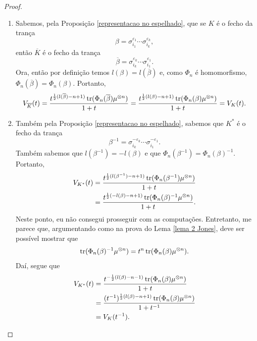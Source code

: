 	\begin{proof}
	    \begin{enumerate}
	        \item Sabemos, pela Proposição \ref{representacao no espelhado}, que se $K$ é o fecho da trança 
	        \[
	        \beta = \sigma_{i_1}^{\varepsilon_1}\cdots\sigma_{i_k}^{\varepsilon_k},
	        \]
	        então $\overline{K}$ é o fecho da trança
	        \[
	        \overline{\beta} = \sigma_{i_k}^{\varepsilon_k}\cdots\sigma_{i_1}^{\varepsilon_1}.
	        \]
	        Ora, então por definição temos $l(\beta) = l(\overline{\beta})$ e, como $\Phi_n$
	        é homomorfismo, $\Phi_n(\overline{\beta}) = \Phi_n(\beta)$. Portanto,
	        \[
	        V_{\overline{K}}(t) 
	        = \frac{t^{\frac{1}{2}(l(\overline{\beta}) - n + 1)}\operatorname{tr}(\Phi_n(\overline{\beta})\mu^{\otimes n})}{1+t}
	        = \frac{t^{\frac{1}{2}(l(\beta) - n + 1)}\operatorname{tr}(\Phi_n(\beta)\mu^{\otimes n})}{1+t}
	        = V_{K}(t).
	        \]
	        \item Também pela Proposição \ref{representacao no espelhado}, sabemos que $K^*$
	        é o fecho da trança
	        \[
	        \beta^{-1} = \sigma_{i_k}^{-\varepsilon_k}\cdots\sigma_{i_1}^{-\varepsilon_1}.
	        \]
	        Também sabemos que $l(\beta^{-1}) = -l(\beta)$ e que $\Phi_n(\beta^{-1}) = \Phi_n(\beta)^{-1}$.
	        Portanto,
	        \begin{align*}
	            V_{K^*}(t) &= \frac{t^{\frac{1}{2}(l(\beta^{-1})- n + 1)}\operatorname{tr}(\Phi_n(\beta^{-1})\mu^{\otimes n})}{1+t} \\
	                       &= \frac{t^{\frac{1}{2}(-l(\beta) - n + 1)}\operatorname{tr}(\Phi_n(\beta)^{-1}\mu^{\otimes n})}{1+t}.
	        \end{align*}
	        Neste ponto, eu não consegui prosseguir com as computações. Entretanto, me parece que,
	        argumentando como na prova do Lema \ref{lema 2 Jones}, deve ser possível mostrar que
	        \[
	        \operatorname{tr}(\Phi_n(\beta)^{-1}\mu^{\otimes n}) = t^n\operatorname{tr}(\Phi_n(\beta)\mu^{\otimes n}).
	        \]
	        Daí, segue que
	        \begin{align*}
	            V_{K^*}(t) 
	            &= \frac{t^{-\frac{1}{2}(l(\beta) - n - 1)}\operatorname{tr}(\Phi_n(\beta)\mu^{\otimes n})}{1+t} \\
	            &= \frac{(t^{-1})^{\frac{1}{2}(l(\beta) - n + 1)}
	            \operatorname{tr}(\Phi_n(\beta)\mu^{\otimes n})}{1+t^{-1}} \\
	            &= V_K(t^{-1}).
	        \end{align*}
	    \end{enumerate}
	\end{proof}
